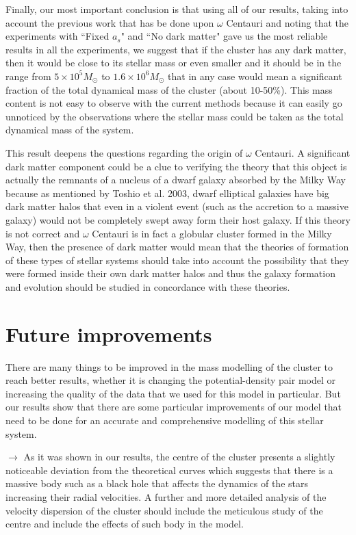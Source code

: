 Finally, our most important conclusion is that using all of our results, taking into account the previous work that has be done upon $\omega$ Centauri and noting that the experiments with ``Fixed $a_s$" and ``No dark matter" gave us the most reliable results in all the experiments, we suggest that if the cluster has any dark matter, then it would be close to its stellar mass or even smaller and it should be in the range from $5 \times 10^{5} M_{\odot}$ to $1.6 \times 10^{6} M_{\odot}$ that in any case would mean a significant fraction of the total dynamical mass of the cluster (about 10-50\%). This mass content is not easy to observe with the current methods because it can easily go unnoticed by the observations where the stellar mass could be taken as the total dynamical mass of the system.

This result deepens the questions regarding the origin of $\omega$ Centauri. A significant dark matter component could be a clue to verifying the theory that this object is actually the remnants of a nucleus of a dwarf galaxy absorbed by the Milky Way because as mentioned by Toshio et al. 2003, dwarf elliptical galaxies have big dark matter halos that even in a violent event (such as the accretion to a massive galaxy) would not be completely swept away form their host galaxy. If this theory is not correct and $\omega$ Centauri is in fact a globular cluster formed in the Milky Way, then the presence of dark matter would mean that the theories of formation of these types of stellar systems should take into account the possibility that they were formed inside their own dark matter halos and thus the galaxy formation and evolution should be studied in concordance with these theories. 

\section{Future improvements}

There are many things to be improved in the mass modelling of the cluster to reach better results, whether it is changing the potential-density pair model or increasing the quality of the data that we used for this model in particular. But our results show that there are some particular improvements of our model that need to be done for an accurate and comprehensive modelling of this stellar system.

$\rightarrow$ As it was shown in our results, the centre of the cluster presents a slightly noticeable deviation from the theoretical curves which suggests that there is a massive body such as a black hole that affects the dynamics of the stars increasing their radial velocities. A further and more detailed analysis of the velocity dispersion of the cluster should include the meticulous study of the centre and include the effects of such body in the model.

